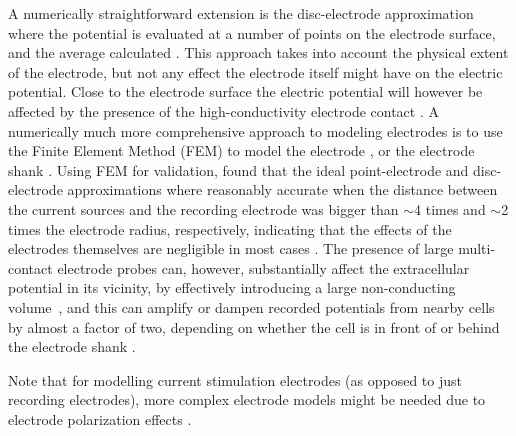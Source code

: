 A numerically straightforward extension is the disc-electrode approximation where the potential is evaluated at a number of points on the electrode surface, and the average calculated \citep{ Linden2014}. This approach takes into account the physical extent of the electrode, but not any effect the electrode itself might have on the electric potential. Close to the electrode surface the electric potential will however be affected by the presence of the high-conductivity electrode contact \citep{McIntyre2001, Moulin2008}. A numerically much more comprehensive approach to modeling electrodes is to use the Finite Element Method (FEM) to model the electrode \citep{Moulin2008, Ness2015}, or the electrode shank \citep{Moffitt2005, Buccino2019b}. Using FEM for validation, \cite{Ness2015} found that the ideal point-electrode and disc-electrode approximations where reasonably accurate when the distance between the current sources and the recording electrode was bigger than $\sim$4 times and $\sim$2 times the electrode radius, respectively, indicating that the effects of the electrodes themselves are negligible in most cases \citep{Nelson2010}.
The presence of large multi-contact electrode probes can, however, substantially affect the extracellular potential in its vicinity, by effectively introducing a large non-conducting volume~\citep{Mechler2012}, and this can amplify or dampen recorded potentials from nearby cells by almost a factor of two, depending on whether the cell is in front of or behind the electrode shank \citep{Buccino2019b}.

Note that for modelling current stimulation electrodes (as opposed to just recording electrodes), more complex electrode models might be needed due to electrode polarization effects \citep{McIntyre2001, Martinsen2008, Joucla2012}.



